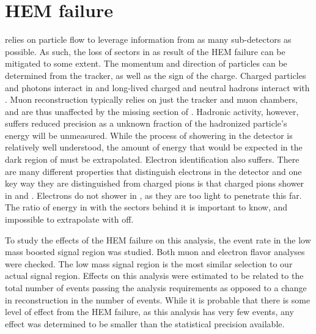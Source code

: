 \section{HEM failure}
\label{sec:HEMfailure}
\CMS relies on particle flow to leverage information from as many sub-detectors as possible. As such, the loss of sectors in \HCAL as result of the HEM failure can be mitigated to some extent. The momentum and direction of particles can be determined from the tracker, as well as the sign of the charge.  Charged particles and photons interact in \ECAL and long-lived charged and neutral hadrons interact with \HCAL. Muon reconstruction typically relies on just the tracker and muon chambers, and are thus unaffected by the missing section of \HCAL.  Hadronic activity, however, suffers reduced precision as a unknown fraction of the hadronized particle's energy will be unmeasured. While the process of showering in the detector is relatively well understood, the amount of energy that would be expected in the dark region of \HCAL must be extrapolated. Electron identification also suffers. There are many different properties that distinguish electrons in the detector and one key way they are distinguished from charged pions is that charged pions shower in \ECAL and \HCAL. Electrons do not shower in \HCAL, as they are too light to penetrate this far.  The ratio of energy in \ECAL with the \HCAL sectors behind it is important to know, and impossible to extrapolate with \HCAL off.  

To study the effects of the HEM failure on this analysis, the event rate in the low mass boosted signal region was studied. Both muon and electron flavor analyses were checked. The low mass signal region is the most similar selection to our actual signal region. Effects on this analysis were estimated to be related to the total number of events passing the analysis requirements as opposed to a change in reconstruction in the number of events. While it is probable that there is some level of effect from the HEM failure, as this analysis has very few events, any effect was determined to be smaller than the statistical precision available.

